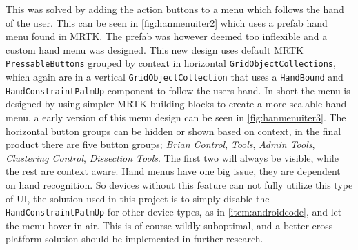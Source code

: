 This was solved by adding the action buttons to a menu which follows the hand of the user. This can be seen in \autoref{fig:hanmenuiter2} which uses a prefab hand menu found in MRTK. The prefab was however deemed too inflexible and a custom hand menu was designed. This new design uses default MRTK \texttt{PressableButtons} grouped by context in horizontal \texttt{GridObjectCollections}, which again are in a vertical \texttt{GridObjectCollection} that uses a \texttt{HandBound} and \texttt{HandConstraintPalmUp} component to follow the users hand. In short the menu is designed by using simpler MRTK building blocks to create a more scalable hand menu, a early version of this menu design can be seen in \autoref{fig:hanmenuiter3}. The horizontal button groups can be hidden or shown based on context, in the final product there are five button groups; \textit{Brian Control}, \textit{Tools}, \textit{Admin Tools}, \textit{Clustering Control}, \textit{Dissection Tools}. The first two will always be visible, while the rest are context aware.
Hand menus have one big issue, they are dependent on hand recognition. So devices without this feature can not fully utilize this type of UI, the solution used in this project is to simply disable the \texttt{HandConstraintPalmUp} for other device types, as in \autoref{item:androidcode}, and let the menu hover in air. This is of course wildly suboptimal, and a better cross platform solution should be implemented in further research.


